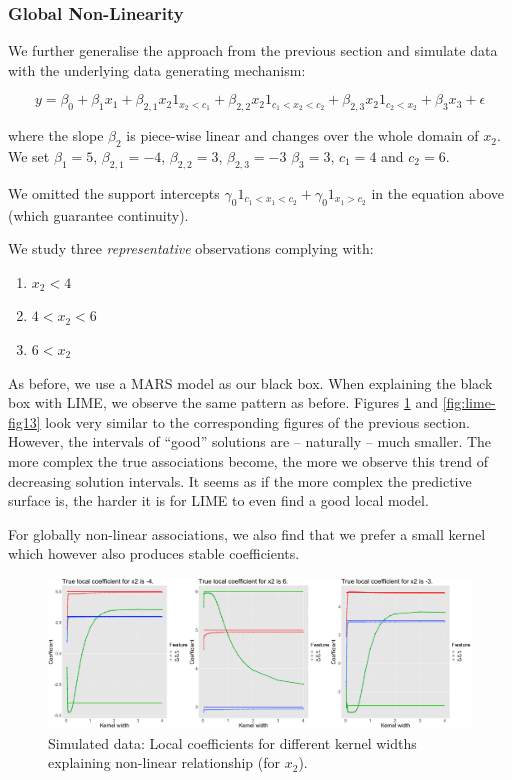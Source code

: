 \documentclass[]{krantz}
\begin{document}
\subsubsection{Global Non-Linearity}\label{id413}

We further generalise the approach from the previous section and
simulate data with the underlying data generating mechanism:

\[ y = \beta_0 + \beta_1 x_1 + \beta_{2,1} x_2 1_{x_2<c_1} + \beta_{2,2} x_2 1_{c_1 < x_2 < c_2} +  \beta_{2,3} x_2 1_{c_2 < x_2} + \beta_3 x_3 + \epsilon \]

where the slope \(\beta_2\) is piece-wise linear and changes over the
whole domain of \(x_2\). We set \(\beta_1 = 5\), \(\beta_{2,1} = -4\),
\(\beta_{2,2} = 3\), \(\beta_{2,3} = -3\) \(\beta_3 = 3\), \(c_1 = 4\)
and \(c_2 = 6\).

We omitted the support intercepts
\(\gamma_0 1_{c_1 < x_1 < c_2} + \gamma_0 1_{x_1 > c_2}\) in the
equation above (which guarantee continuity).

We study three \emph{representative} observations complying with:

\begin{enumerate}
\def\labelenumi{\arabic{enumi}.}
\item
  \(x_2 < 4\)
\item
  \(4 < x_2 < 6\)
\item
  \(6 < x_2\)
\end{enumerate}

As before, we use a MARS model as our black box. When explaining the
black box with LIME, we observe the same pattern as before. Figures
\ref{fig:lime-fig12} and \ref{fig:lime-fig13} look very similar to the
corresponding figures of the previous section. However, the intervals of
``good'' solutions are -- naturally -- much smaller. The more complex
the true associations become, the more we observe this trend of
decreasing solution intervals. It seems as if the more complex the
predictive surface is, the harder it is for LIME to even find a good
local model.

For globally non-linear associations, we also find that we prefer a
small kernel which however also produces stable coefficients.

\begin{figure}

{\centering \includegraphics[width=0.99\linewidth]{images/04-09-12} 

}

\caption{Simulated data: Local coefficients for different kernel widths explaining non-linear relationship (for $x_2$).}\label{fig:lime-fig12}
\end{figure}
\end{document}
